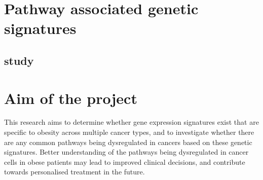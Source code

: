 \section{Pathway associated genetic signatures}
\label{sec:pathway_associated_genetic_signatures}


\subsection{\citep{Gatza2011} study}
\label{sub:gatza_study}





\section{Aim of the project}
\label{sec:aim}

This research aims to determine whether gene expression signatures exist  that are specific to obesity across multiple cancer types, and to investigate whether there are any common pathways being dysregulated in cancers based on these genetic signatures.
Better understanding of the pathways being dysregulated in cancer cells in obese patients may lead to improved clinical decisions, and contribute towards personalised treatment in the future.

